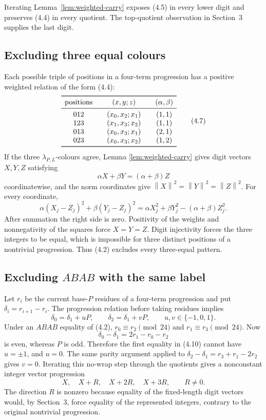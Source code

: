 \documentclass[11pt]{article}
\theoremstyle{definition}
\newcommand{\norm}[1]{\left\lVert #1\right\rVert}
\begin{document}
Iterating Lemma~\ref{lem:weighted-carry} exposes (4.5) in every lower digit
and preserves (4.4) in every quotient.  The top-quotient observation in
Section~3 supplies the last digit.

\subsection{Excluding three equal colours}

Each possible triple of positions in a four-term progression has a positive
weighted relation of the form (4.4):
\[
\begin{array}{c@{\qquad}c@{\qquad}c}
\toprule
\text{positions}&(x,y;z)&(\alpha,\beta)\\
\midrule
012&(x_0,x_2;x_1)&(1,1)\\
123&(x_1,x_3;x_2)&(1,1)\\
013&(x_0,x_3;x_1)&(2,1)\\
023&(x_0,x_3;x_2)&(1,2)\\
\bottomrule
\end{array}
\tag{4.7}
\]
If the three \(\lambda_{P,L}\)-colours agree, Lemma
\ref{lem:weighted-carry} gives digit vectors \(X,Y,Z\) satisfying
\[
 \alpha X+\beta Y=(\alpha+\beta)Z
 \tag{4.8}
\]
coordinatewise, and the norm coordinates give
\(\norm X^2=\norm Y^2=\norm Z^2\).  For every coordinate,
\[
 \alpha(X_j-Z_j)^2+\beta(Y_j-Z_j)^2
 =\alpha X_j^2+\beta Y_j^2-(\alpha+\beta)Z_j^2.
 \tag{4.9}
\]
After summation the right side is zero.  Positivity of the weights and
nonnegativity of the squares force \(X=Y=Z\).  Digit injectivity forces the
three integers to be equal, which is impossible for three distinct positions
of a nontrivial progression.  Thus (4.2) excludes every three-equal pattern.

\subsection{Excluding \(ABAB\) with the same label}

Let \(r_i\) be the current base-\(P\) residues of a four-term progression
and put \(\delta_i=r_{i+1}-r_i\).  The progression relation before taking
residues implies
\[
 \delta_0=\delta_1+uP,\qquad
 \delta_2=\delta_1+vP,\qquad u,v\in\{-1,0,1\}.
 \tag{4.10}
\]
Under an \(ABAB\) equality of (4.2),
\(r_0\equiv r_2\pmod {24}\) and
\(r_1\equiv r_3\pmod {24}\).  Now
\[
 \delta_0-\delta_1=2r_1-r_0-r_2
 \tag{4.11}
\]
is even, whereas \(P\) is odd.  Therefore the first equality in (4.10)
cannot have \(u=\pm1\), and \(u=0\).  The same parity argument applied to
\(\delta_2-\delta_1=r_3+r_1-2r_2\) gives \(v=0\).  Iterating this no-wrap
step through the quotients gives a nonconstant integer vector progression
\[
 X,\quad X+R,\quad X+2R,\quad X+3R,
 \qquad R\ne0.
 \tag{4.12}
\]
The direction \(R\) is nonzero because equality of the fixed-length digit
vectors would, by Section~3, force equality of the represented integers,
contrary to the original nontrivial progression.
\end{document}
